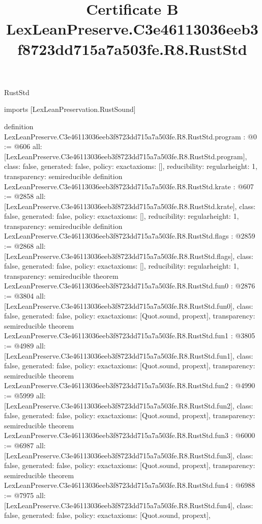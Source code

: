 \begin{lexlean}{RustStd}
\title{Certificate B LexLeanPreserve.C3e46113036eeb3f8723dd715a7a503fe.R8.RustStd}
\begin{coremodule}
imports [LexLeanPreservation.RustSound]

definition LexLeanPreserve.C3e46113036eeb3f8723dd715a7a503fe.R8.RustStd.program : @0 := @606 {
  all: [LexLeanPreserve.C3e46113036eeb3f8723dd715a7a503fe.R8.RustStd.program],
  class: false,
  generated: false,
  policy: exact{axioms: []},
  reducibility: regular{height: 1},
  transparency: semireducible
}
definition LexLeanPreserve.C3e46113036eeb3f8723dd715a7a503fe.R8.RustStd.krate : @607 := @2858 {
  all: [LexLeanPreserve.C3e46113036eeb3f8723dd715a7a503fe.R8.RustStd.krate],
  class: false,
  generated: false,
  policy: exact{axioms: []},
  reducibility: regular{height: 1},
  transparency: semireducible
}
definition LexLeanPreserve.C3e46113036eeb3f8723dd715a7a503fe.R8.RustStd.flags : @2859 := @2868 {
  all: [LexLeanPreserve.C3e46113036eeb3f8723dd715a7a503fe.R8.RustStd.flags],
  class: false,
  generated: false,
  policy: exact{axioms: []},
  reducibility: regular{height: 1},
  transparency: semireducible
}
theorem LexLeanPreserve.C3e46113036eeb3f8723dd715a7a503fe.R8.RustStd.fun0 : @2876 := @3804 {
  all: [LexLeanPreserve.C3e46113036eeb3f8723dd715a7a503fe.R8.RustStd.fun0],
  class: false,
  generated: false,
  policy: exact{axioms: [Quot.sound, propext]},
  transparency: semireducible
}
theorem LexLeanPreserve.C3e46113036eeb3f8723dd715a7a503fe.R8.RustStd.fun1 : @3805 := @4989 {
  all: [LexLeanPreserve.C3e46113036eeb3f8723dd715a7a503fe.R8.RustStd.fun1],
  class: false,
  generated: false,
  policy: exact{axioms: [Quot.sound, propext]},
  transparency: semireducible
}
theorem LexLeanPreserve.C3e46113036eeb3f8723dd715a7a503fe.R8.RustStd.fun2 : @4990 := @5999 {
  all: [LexLeanPreserve.C3e46113036eeb3f8723dd715a7a503fe.R8.RustStd.fun2],
  class: false,
  generated: false,
  policy: exact{axioms: [Quot.sound, propext]},
  transparency: semireducible
}
theorem LexLeanPreserve.C3e46113036eeb3f8723dd715a7a503fe.R8.RustStd.fun3 : @6000 := @6987 {
  all: [LexLeanPreserve.C3e46113036eeb3f8723dd715a7a503fe.R8.RustStd.fun3],
  class: false,
  generated: false,
  policy: exact{axioms: [Quot.sound, propext]},
  transparency: semireducible
}
theorem LexLeanPreserve.C3e46113036eeb3f8723dd715a7a503fe.R8.RustStd.fun4 : @6988 := @7975 {
  all: [LexLeanPreserve.C3e46113036eeb3f8723dd715a7a503fe.R8.RustStd.fun4],
  class: false,
  generated: false,
  policy: exact{axioms: [Quot.sound, propext]},
}
\end{coremodule}
\end{lexlean}

